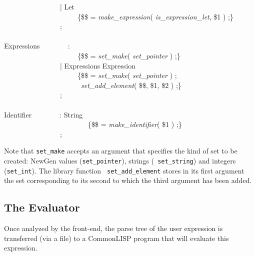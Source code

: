 \begin{pgm}
~~~~~~~~~~~~~~~~| Let \\
~~~~~~~~~~~~~~~~~~~~~\{\$\$ = {\sl make\_expression}( 
                                {\sl is\_expression\_let}, \$1 ) ;\} \\
~~~~~~~~~~~~~~~~; \\
 \\
Expressions~~~~~~~~: \\
~~~~~~~~~~~~~~~~~~~~~\{\$\$ = {\sl set\_make}( {\sl set\_pointer} ) ;\} \\
~~~~~~~~~~~~~~~~| Expressions Expression  \\
~~~~~~~~~~~~~~~~~~~~~\{\$\$ = {\sl set\_make}( {\sl set\_pointer} ) ; \\
~~~~~~~~~~~~~~~~~~~~~~{\sl set\_add\_element}( \$\$, \$1, \$2 ) ;\} \\
~~~~~~~~~~~~~~~~; \\
 \\
Identifier~~~~~~~~: String  \\
~~~~~~~~~~~~~~~~~~~~~~~~\{\$\$ = {\sl make\_identifier}( \$1 ) ;\} \\
~~~~~~~~~~~~~~~~; 
\end{pgm}
Note that {\tt set\_make} accepts an argument that specifies the kind of
set to be created: NewGen values ({\tt set\_pointer}), strings ({\tt
set\_string}) and integers ({\tt set\_int}). The library function {\tt
set\_add\_element} stores in its first argument the set corresponding to
its second to which the third argument has been added.

\subsection{The Evaluator}

Once analyzed by the front-end, the parse tree of the user expression is
transferred (via a file) to a CommonLISP program that will evaluate this
expression.

